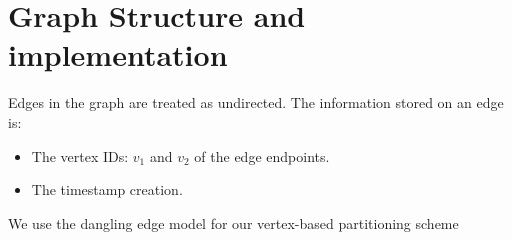 \section{Graph Structure and implementation}

Edges in the graph are treated as undirected. The information stored on an edge
is:
\begin{itemize}
\item The vertex IDs: $v_1$ and $v_2$ of the edge endpoints.
\item The timestamp creation.
\end{itemize}
We use the dangling edge model \cite{Chairunnanda12} for our vertex-based
partitioning scheme
